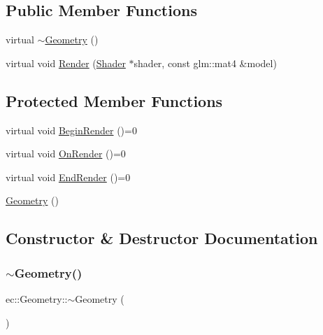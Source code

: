 \subsection*{Public Member Functions}
\begin{DoxyCompactItemize}
\item 
virtual \mbox{\hyperlink{classec_1_1_geometry_a964c581313da2be51a3c78d3be7f48b3}{$\sim$\+Geometry}} ()
\item 
virtual void \mbox{\hyperlink{classec_1_1_geometry_a8de70c6fd7391ec0555b2df57912b177}{Render}} (\mbox{\hyperlink{classec_1_1_shader}{Shader}} $\ast$shader, const glm\+::mat4 \&model)
\end{DoxyCompactItemize}
\subsection*{Protected Member Functions}
\begin{DoxyCompactItemize}
\item 
virtual void \mbox{\hyperlink{classec_1_1_geometry_a184b4fdde8062c1dc0eb9e3393cc540f}{Begin\+Render}} ()=0
\item 
virtual void \mbox{\hyperlink{classec_1_1_geometry_ae49d24667dca154cba707b0c219a8eb2}{On\+Render}} ()=0
\item 
virtual void \mbox{\hyperlink{classec_1_1_geometry_a41ed9550a0d1746c55add3c3c0a38984}{End\+Render}} ()=0
\item 
\mbox{\hyperlink{classec_1_1_geometry_a409c80ac243a5eb27c2a98b17cc8b3e9}{Geometry}} ()
\end{DoxyCompactItemize}


\subsection{Constructor \& Destructor Documentation}
\mbox{\label{classec_1_1_geometry_a964c581313da2be51a3c78d3be7f48b3}} 
\subsubsection{\texorpdfstring{$\sim$\+Geometry()}{~Geometry()}}
{\footnotesize\ttfamily ec\+::\+Geometry\+::$\sim$\+Geometry (\begin{DoxyParamCaption}{ }\end{DoxyParamCaption})\hspace{0.3cm}{\ttfamily [virtual]}}

